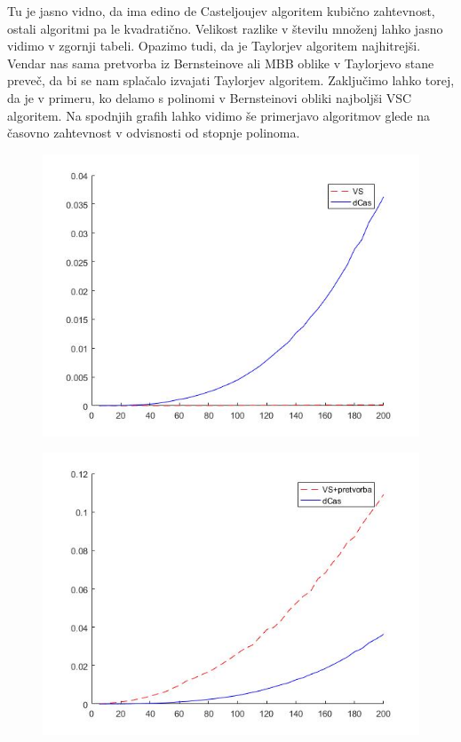 \documentclass{article}
\begin{document}
Tu je jasno vidno, da ima edino de Casteljoujev algoritem kubično zahtevnost, ostali algoritmi pa le kvadratično. Velikost razlike v številu množenj lahko jasno vidimo v zgornji tabeli. Opazimo tudi, da je Taylorjev algoritem najhitrejši. Vendar nas sama pretvorba iz Bernsteinove ali MBB oblike v Taylorjevo stane preveč, da bi se nam splačalo izvajati Taylorjev algoritem. Zaključimo lahko torej, da je v primeru, ko delamo s polinomi v Bernsteinovi obliki najboljši VSC algoritem.
Na spodnjih grafih lahko vidimo še primerjavo algoritmov glede na časovno zahtevnost v odvisnosti od stopnje polinoma.
\begin{figure}[h]
\centering
\begin{minipage}{.5\textwidth}
\centering
 \includegraphics[scale=0.3]{vs}
\label{fig:vs}
\end{minipage}%
\begin{minipage}{.5\textwidth}
\centering
 \includegraphics[scale=0.3]{vs_potratn.jpg}
\label{fig:vspot}
\end{minipage}
\end{figure}
\end{document}
